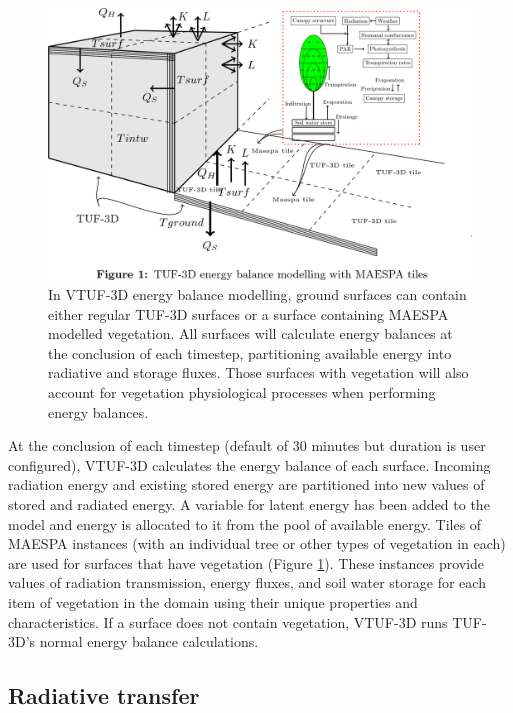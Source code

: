 \documentclass[final,3p,times,authoryear]{elsarticle}
\begin{document}
\begin{figure}[!htbp]
 \includegraphics[trim = 0mm 14mm 22mm 0.0mm, clip, scale=0.25]{images/TUFWithMaespaInsert.png}
 \caption{\label{fig:TUFWithMaespaInsert} In VTUF-3D energy balance modelling, ground surfaces can contain either regular TUF-3D surfaces or a surface containing MAESPA modelled vegetation. All surfaces will calculate energy balances at the conclusion of each timestep, partitioning available energy into radiative and storage fluxes. Those surfaces with vegetation will also account for vegetation physiological processes when performing energy balances.}
\end{figure}

At the conclusion of each timestep (default of 30 minutes but duration is user configured), VTUF-3D calculates the energy balance of each surface. Incoming radiation energy and existing stored energy are partitioned into new values of stored and radiated energy. A variable for latent energy has been added to the model and energy is allocated to it from the pool of available energy. Tiles of MAESPA instances (with an individual tree or other types of vegetation in each) are used for surfaces that have vegetation (Figure \ref{fig:TUFWithMaespaInsert}). These instances provide values of radiation transmission, energy fluxes, and soil water storage for each item of vegetation in the domain using their unique properties and characteristics. If a surface does not contain vegetation, VTUF-3D runs TUF-3D's normal energy balance calculations.



\subsection{Radiative transfer}\label{sec:radiativetransfer}
\end{document}
